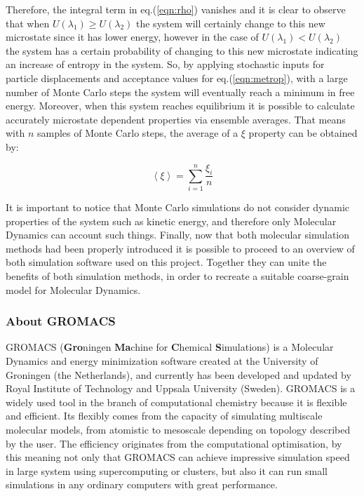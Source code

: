 \documentclass[10pt,a4paper,twoside]{article}
\begin{document}
 Therefore, the integral term in eq.(\ref{eqn:rho}) vanishes and it is clear to observe that when $U(\lambda_1) \geqslant U(\lambda_2)$ the system will certainly change to this new microstate since it has lower energy, however in the case of $U(\lambda_1) < U(\lambda_2)$ the system has a certain probability of changing to this new microstate indicating an increase of entropy in the system. So, by applying stochastic inputs for particle displacements and acceptance values for eq.(\ref{eqn:metrop}), with a large number of Monte Carlo steps the system will eventually reach a minimum in free energy.
  Moreover, when this system reaches equilibrium it is possible to calculate accurately microstate dependent properties via ensemble averages. That means with $n$ samples of Monte Carlo steps, the average of a $ \xi $ property can be obtained by:
 
 \begin{equation}
\left\langle \xi\right\rangle  = \displaystyle \sum_{i=1}^{n} \dfrac{\xi_i}{n}
\label{eqn:average}
\end{equation}

It is important to notice that Monte Carlo simulations do not consider dynamic properties of the system such as kinetic energy, and therefore only Molecular Dynamics can account such things\cite{satoh}. Finally, now that both molecular simulation methods had been properly introduced it is possible to proceed to an overview of both simulation software used on this project. Together they can unite the benefits of both simulation methods, in order to recreate a suitable coarse-grain model for Molecular Dynamics.

\subsubsection*{About GROMACS}

 GROMACS (\textbf{Gro}ningen \textbf{Ma}chine for \textbf{C}hemical \textbf{S}imulations) \cite{gromanual} is a Molecular Dynamics and energy minimization software created at the University of Groningen (the Netherlands), and currently has been developed and updated by Royal Institute of Technology and Uppsala University (Sweden). GROMACS is a widely used tool in the branch of computational chemistry because it is flexible and efficient. Its flexibly comes from the capacity of simulating multiscale molecular models, from atomistic to mesoscale depending on topology described by the user. The efficiency originates from the computational optimisation, by this meaning not only that GROMACS can achieve impressive simulation speed in large system using supercomputing or clusters, but also it can run small simulations in any ordinary computers with great performance.
 
\end{document}

